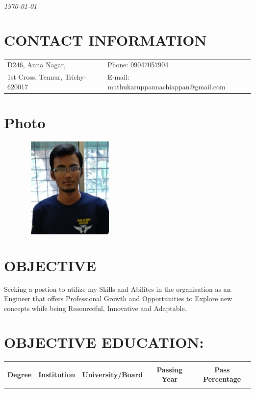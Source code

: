 \documentclass[margin,line]{res}
\begin{document}
 \hfill {\em \today}

\begin{resume}
\section{\sc CONTACT INFORMATION}

\vspace{.05in}
\begin{tabular}{@{}p{3.5in}p{3in}}
D246, Anna Nagar,           & {Phone:}  09047057904 \\
1st Cross, Tennur, Trichy-620017
 & {E-mail:}  muthukaruppannachiappan@gmail.com\\
\end{tabular}

\section{\sc Photo}
\begin{figure}[hbt]
  \includegraphics[width=5cm,height=5cm,keepaspectratio, angle= 0]{muthu.jpg}
\end{figure}


\section{\sc OBJECTIVE}

Seeking a postion to utilize my Skills and Abilites in the organisation as an Engineer that offers Professional Growth and Opportunities to Explore new concepts while being Resourceful, Innovative and Adaptable.\\

\section{\sc OBJECTIVE EDUCATION:}
\begin{tabular}{|c|c|c|c|c|}
\hline
&&&&\\
\textbf{Degree}	&	\textbf{Institution}	&	\textbf{University/Board}	&	\textbf{Passing Year}	&	\textbf{Pass Percentage}\\
&&&&\\ \hline


\end{tabular}
\end{resume}
\end{document}
